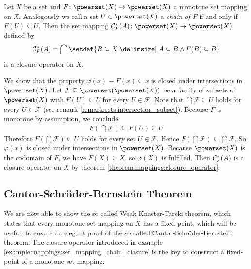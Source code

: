 \begin{examples}
\begin{exampleenumerate}
        \item\label{example:mappings:set_mapping_chain_closure} Let $X$ be a set and $F\colon \powerset(X)\rightarrow\powerset(X)$ a monotone set mapping on $X$. Analogously we call a set $U\in\powerset(X)$ a \emph{chain of $F$} if and only if $F(U)\subseteq U$. Then the set mapping $\chainset^*_{F}(A)\colon \powerset(X)\rightarrow\powerset(X)$ defined by
        \begin{align}\chainset^*_{F}(A)=\bigcap\setdef{B\subseteq X\given A\subseteq B\land F(B)\subseteq B}\end{align}
        is a closure operator on $X$.
        \begin{miniproof}
            We show that the property $\varphi(x)\equiv F(x)\subseteq x$ is closed under intersections in $\powerset(X)$. Let $\mathcal F\subseteq\powerset(\powerset(X))$ be a family of subsets of $\powerset(X)$ with $F(U)\subseteq U$ for every $U\in\mathcal F$. Note that $\bigcap\mathcal F\subseteq U$ holds for every $U\in\mathcal F$ (see remark \ref{remark:sets:intersection_subset}). Because $F$ is monotone by assumption, we conclude
            \begin{align}F(\bigcap\mathcal F)\subseteq F(U)\subseteq U\end{align}
            Therefore $F(\bigcap\mathcal F)\subseteq U$ holds for every set $U\in\mathcal F$. Hence $F(\bigcap\mathcal F)\subseteq \bigcap\mathcal F$. So $\varphi(x)$ is closed under intersections in $\powerset(X)$. Because $\powerset(X)$ is the codomain of $F$, we have $F(X)\subseteq X$, so $\varphi(X)$ is fulfilled. Then $\mathcal C^*_{F}(A)$ is a closure operator on $X$ by theorem \ref{theorem:mappings:closure_operator}.
        \end{miniproof}
    \end{exampleenumerate}
\end{examples}


\subsection{Cantor-Schröder-Bernstein Theorem}

We are now able to show the so called Weak Knaster-Tarski theorem, which states that every monotone set mapping on $X$ has a fixed-point, which will be usefull to ensure an elegant proof of the so called Cantor-Schröder-Bernstein theorem. The closure operator introduced in example \ref{example:mappings:set_mapping_chain_closure} is the key to construct a fixed-point of a monotone set mapping.

